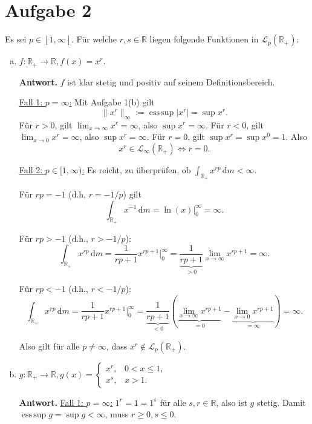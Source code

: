 \documentclass[10pt]{article}\usepackage[]{graphicx}\usepackage[]{color}
\newcommand{\R}{\mathbb{R}}
\newcommand{\df}{\,\textrm{d}}
\DeclareMathOperator*{\esssup}{ess\,sup}
\begin{document}
\section*{Aufgabe 2}
Es sei $p \in [1, \infty]$. Für welche $r,s \in \R$ liegen folgende
Funktionen in $\mathscr{L}_p(\R_+)$:
\begin{enumerate}[(a)]
  \item $f: \R_+ \to \R, f(x) = x^r$.
  
        {\bf Antwort.} $f$ ist klar stetig und positiv auf seinem Definitionsbereich.
        
        \uline{Fall 1: $p = \infty$:} Mit Aufgabe 1(b) gilt
        \[
          \|x^r\|_{\infty} := \esssup|x^r| = \sup x^r.
        \]
        Für $r > 0$, gilt $\lim_{x \to \infty} x^r = \infty$, also $\sup x^r = \infty$.
        Für $r < 0$, gilt $\lim_{x \to 0}x^r = \infty$, also $\sup x^r = \infty$.
        Für $r = 0$, gilt $\sup x^r = \sup x^0 = 1$. Also
        \[
          x^r \in \mathscr{L}_{\infty}(\R_+) \Leftrightarrow r = 0.
        \]
        
        \uline{Fall 2: $p \in [1, \infty)$:}
        Es reicht, zu überprüfen, ob $\int_{\R_+}x^{rp} \df m < \infty$.
        
        Für $rp = -1$ (d.h, $r = -1/p$) gilt
        \[
        \int_{\R_+} x^{-1} \df m = \ln(x)|^{\infty}_0 = \infty.
        \]
        
        Für $rp > -1$ (d.h., $r > -1/p$):
        \[
          \int_{\R_+} x^{rp} \df m = \frac{1}{rp+1} x^{rp+1}|_0^{\infty} = \underbrace{\frac{1}{rp+1}}_{> 0} \lim_{x \to \infty} x^{rp+1} = \infty.
        \]

        Für $rp < -1$ (d.h., $r < -1/p$):
        \[
          \int_{\R_+} x^{rp} \df m = \frac{1}{rp+1} x^{rp+1}|_0^{\infty} = \underbrace{\frac{1}{rp+1}}_{< 0} \left(\underbrace{\lim_{x \to \infty} x^{rp+1}}_{= 0} - \underbrace{\lim_{x \to 0} x^{rp+1}}_{= \infty} \right) = \infty.
        \]
        
        Also gilt für alle $p \neq \infty$, dass $x^r \notin \mathscr{L}_{p}(\R_+)$.
  
  \item $g: \R_+ \to \R, g(x) = \begin{cases}x^r, & 0 < x \leq 1,\\ x^s, & x > 1. \end{cases}$
  
        {\bf Antwort.} 
        \uline{Fall 1: $p = \infty$:}
        $1^r = 1 = 1^s$ für alle $s,r \in \R$, also ist $g$ stetig.
        Damit $\esssup g = \sup g < \infty$, muss $r \geq 0, s \leq 0$.
        

\end{enumerate}
\end{document}
